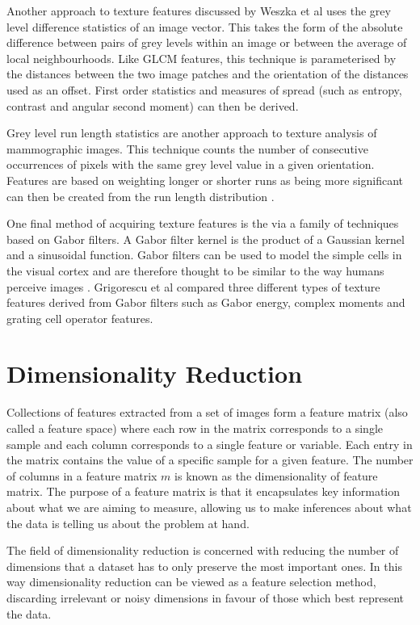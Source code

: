 Another approach to texture features discussed by Weszka et al \cite{weszka1976comparative} uses the grey level difference statistics of an image vector. This takes the form of the absolute difference between pairs of grey levels within an image or between the average of local neighbourhoods. Like GLCM features, this technique is parameterised by the distances between the two image patches and the orientation of the distances used as an offset. First order statistics and measures of spread (such as entropy, contrast and angular second moment) can then be derived.

Grey level run length statistics are another approach to texture analysis of mammographic images. This technique counts the number of consecutive occurrences of pixels with the same grey level value in a given orientation. Features are based on weighting longer or shorter runs as being more significant can then be created from the run length distribution \cite{weszka1976comparative, cheng2006approaches}.

One final method of acquiring texture features is the via a family of techniques based on Gabor filters. A Gabor filter kernel is the product of a Gaussian kernel and a  sinusoidal function. Gabor filters can be used to model the simple cells in the visual cortex and are therefore thought to be similar to the way humans perceive images \cite{marvcelja1980mathematical}. Grigorescu et al \cite{grigorescu2002comparison} compared three different types of texture features derived from Gabor filters such as Gabor energy, complex moments and grating cell operator features. 

\section{Dimensionality Reduction}
Collections of features extracted from a set of images form a feature matrix (also called a feature space) where each row in the matrix corresponds to a single sample and each column corresponds to a single feature or variable. Each entry in the matrix contains the value of a specific sample for a given feature. The number of columns in a feature matrix $m$ is known as the dimensionality of feature matrix. The purpose of a feature matrix is that it encapsulates key information about what we are aiming to measure, allowing us to make inferences about what the data is telling us about the problem at hand.

The field of dimensionality reduction is concerned with reducing the number of dimensions that a dataset has to only preserve the most important ones. In this way dimensionality reduction can be viewed as a feature selection method, discarding irrelevant or noisy dimensions in favour of those which best represent the data.

